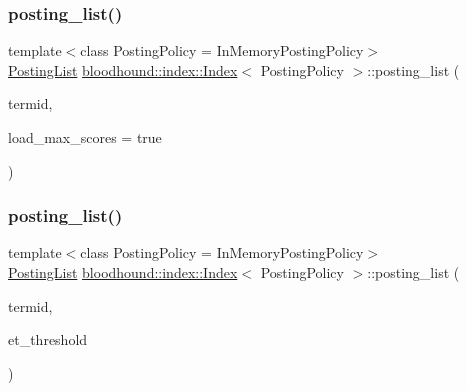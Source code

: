 \subsubsection{\texorpdfstring{posting\+\_\+list()}{posting\_list()}\hspace{0.1cm}{\footnotesize\ttfamily [1/2]}}
{\footnotesize\ttfamily template$<$class Posting\+Policy = In\+Memory\+Posting\+Policy$>$ \\
\hyperlink{classbloodhound_1_1PostingList}{Posting\+List} \hyperlink{classbloodhound_1_1index_1_1Index}{bloodhound\+::index\+::\+Index}$<$ Posting\+Policy $>$\+::posting\+\_\+list (\begin{DoxyParamCaption}\item[{\hyperlink{structbloodhound_1_1TermId}{Term\+Id}}]{termid,  }\item[{bool}]{load\+\_\+max\+\_\+scores = {\ttfamily true} }\end{DoxyParamCaption})\hspace{0.3cm}{\ttfamily [inline]}}

\mbox{\label{classbloodhound_1_1index_1_1Index_ac26271e4e2678e77d46017a24ed7eac5}} 
\subsubsection{\texorpdfstring{posting\+\_\+list()}{posting\_list()}\hspace{0.1cm}{\footnotesize\ttfamily [2/2]}}
{\footnotesize\ttfamily template$<$class Posting\+Policy = In\+Memory\+Posting\+Policy$>$ \\
\hyperlink{classbloodhound_1_1PostingList}{Posting\+List} \hyperlink{classbloodhound_1_1index_1_1Index}{bloodhound\+::index\+::\+Index}$<$ Posting\+Policy $>$\+::posting\+\_\+list (\begin{DoxyParamCaption}\item[{\hyperlink{structbloodhound_1_1TermId}{Term\+Id}}]{termid,  }\item[{double}]{et\+\_\+threshold }\end{DoxyParamCaption})\hspace{0.3cm}{\ttfamily [inline]}}

\mbox{\label{classbloodhound_1_1index_1_1Index_ae36f606ee2206c44d44d0a11ae91b04c}} 
